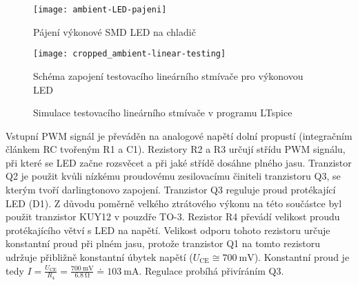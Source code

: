 \begin{figure}[htbp]
    \centering
    \texttt{[image: ambient-LED-pajeni]}
    \caption{Pájení výkonové SMD LED na chladič}
    \label{fig:ambient LED pajeni}
\end{figure}



\begin{figure}[htbp]
    \centering
    \texttt{[image: cropped\_ambient-linear-testing]}
    \caption{Schéma zapojení testovacího lineárního stmívače pro výkonovou LED}
    \label{fig:ambient linear testing sch}
\end{figure}

\begin{figure}[htbp]
    \centering
    \caption{Simulace testovacího lineárního stmívače v programu LTspice}
    \label{fig:ambient linear testing sim}
\end{figure}

Vstupní PWM signál je převáděn na analogové napětí dolní propustí (integračním
článkem RC tvořeným R1 a C1). Rezistory R2 a R3 určují střídu PWM
signálu, při které se LED začne rozsvěcet a při jaké střídě dosáhne plného
jasu. Tranzistor Q2 je použit kvůli nízkému proudovému zesilovacímu činiteli
tranzistoru Q3, se kterým tvoří darlingtonovo zapojení. Tranzistor Q3 reguluje
proud protékající LED (D1). Z důvodu poměrně velkého ztrátového výkonu na této
součástce byl použit tranzistor KUY12 v pouzdře TO-3. Rezistor R4 převádí
velikost proudu protékajícího větví s LED na napětí. Velikost odporu tohoto
rezistoru určuje konstantní proud při plném jasu, protože tranzistor Q1 na
tomto rezistoru udržuje přibližně
konstantní úbytek napětí ($U_\mathrm{CE} \cong \SI{700}{\milli\volt}$).
Konstantní proud je tedy $I = \frac{U_\mathrm{CE}}{R_4} =
\frac{\SI{700}{\milli\volt}}{\SI{6,8}{\ohm}} \doteq \SI{103}{\milli\ampere}$.
Regulace probíhá přivíráním Q3.

\FloatBarrier
